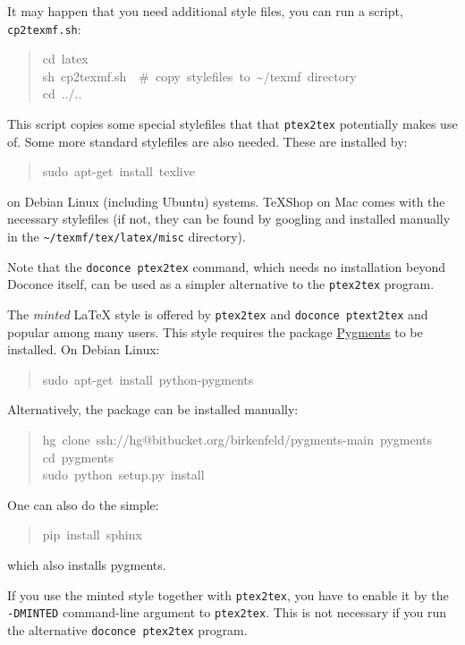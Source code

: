 \documentclass[a4paper]{article}
\begin{document}
It may happen that you need additional style files, you can run
a script, \texttt{cp2texmf.sh}:
%
\begin{quote}{\ttfamily \raggedright \noindent
cd~latex\\
sh~cp2texmf.sh~~\#~copy~stylefiles~to~\textasciitilde{}/texmf~directory\\
cd~../..
}
\end{quote}

This script copies some special stylefiles that
that \texttt{ptex2tex} potentially makes use of. Some more standard stylefiles
are also needed. These are installed by:
%
\begin{quote}{\ttfamily \raggedright \noindent
sudo~apt-get~install~texlive
}
\end{quote}

on Debian Linux (including Ubuntu) systems. TeXShop on Mac comes with
the necessary stylefiles (if not, they can be found by googling and installed
manually in the \texttt{\textasciitilde{}/texmf/tex/latex/misc} directory).

Note that the \texttt{doconce ptex2tex} command, which needs no installation
beyond Doconce itself, can be used as a simpler alternative to the \texttt{ptex2tex}
program.

The \emph{minted} LaTeX style is offered by \texttt{ptex2tex} and \texttt{doconce ptext2tex}
and popular among many
users. This style requires the package \href{http://pygments.org}{Pygments}
to be installed. On Debian Linux:
%
\begin{quote}{\ttfamily \raggedright \noindent
sudo~apt-get~install~python-pygments
}
\end{quote}

Alternatively, the package can be installed manually:
%
\begin{quote}{\ttfamily \raggedright \noindent
hg~clone~ssh://hg@bitbucket.org/birkenfeld/pygments-main~pygments\\
cd~pygments\\
sudo~python~setup.py~install
}
\end{quote}

One can also do the simple:
%
\begin{quote}{\ttfamily \raggedright \noindent
pip~install~sphinx
}
\end{quote}

which also installs pygments.

If you use the minted style together with \texttt{ptex2tex}, you have to
enable it by the \texttt{-DMINTED} command-line argument to \texttt{ptex2tex}.
This is not necessary if you run the alternative \texttt{doconce ptex2tex} program.
\end{document}
